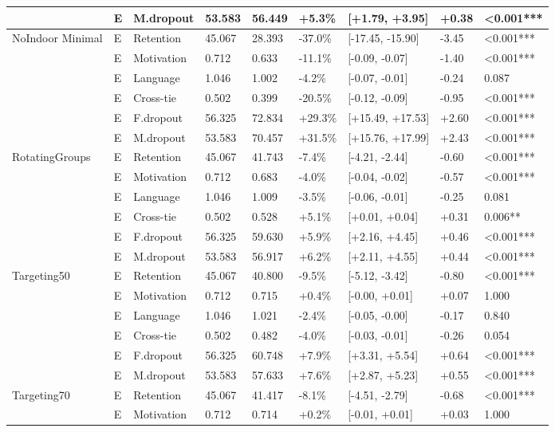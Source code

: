 \begin{longtable}[t]{lllllllll}
  & E & M.dropout & 53.583 & 56.449 & +5.3\% & [+1.79, +3.95] & +0.38 & <0.001***\\
\midrule
NoIndoor Minimal & E & Retention & 45.067 & 28.393 & -37.0\% & [-17.45, -15.90] & -3.45 & <0.001***\\
  & E & Motivation & 0.712 & 0.633 & -11.1\% & [-0.09, -0.07] & -1.40 & <0.001***\\
  & E & Language & 1.046 & 1.002 & -4.2\% & [-0.07, -0.01] & -0.24 & 0.087\\
  & E & Cross-tie & 0.502 & 0.399 & -20.5\% & [-0.12, -0.09] & -0.95 & <0.001***\\
  & E & F.dropout & 56.325 & 72.834 & +29.3\% & [+15.49, +17.53] & +2.60 & <0.001***\\
  & E & M.dropout & 53.583 & 70.457 & +31.5\% & [+15.76, +17.99] & +2.43 & <0.001***\\
\midrule
RotatingGroups & E & Retention & 45.067 & 41.743 & -7.4\% & [-4.21, -2.44] & -0.60 & <0.001***\\
  & E & Motivation & 0.712 & 0.683 & -4.0\% & [-0.04, -0.02] & -0.57 & <0.001***\\
  & E & Language & 1.046 & 1.009 & -3.5\% & [-0.06, -0.01] & -0.25 & 0.081\\
  & E & Cross-tie & 0.502 & 0.528 & +5.1\% & [+0.01, +0.04] & +0.31 & 0.006**\\
  & E & F.dropout & 56.325 & 59.630 & +5.9\% & [+2.16, +4.45] & +0.46 & <0.001***\\
  & E & M.dropout & 53.583 & 56.917 & +6.2\% & [+2.11, +4.55] & +0.44 & <0.001***\\
\midrule
Targeting50 & E & Retention & 45.067 & 40.800 & -9.5\% & [-5.12, -3.42] & -0.80 & <0.001***\\
  & E & Motivation & 0.712 & 0.715 & +0.4\% & [-0.00, +0.01] & +0.07 & 1.000\\
  & E & Language & 1.046 & 1.021 & -2.4\% & [-0.05, -0.00] & -0.17 & 0.840\\
  & E & Cross-tie & 0.502 & 0.482 & -4.0\% & [-0.03, -0.01] & -0.26 & 0.054\\
  & E & F.dropout & 56.325 & 60.748 & +7.9\% & [+3.31, +5.54] & +0.64 & <0.001***\\
  & E & M.dropout & 53.583 & 57.633 & +7.6\% & [+2.87, +5.23] & +0.55 & <0.001***\\
\midrule
Targeting70 & E & Retention & 45.067 & 41.417 & -8.1\% & [-4.51, -2.79] & -0.68 & <0.001***\\
  & E & Motivation & 0.712 & 0.714 & +0.2\% & [-0.01, +0.01] & +0.03 & 1.000\\

\end{longtable}
